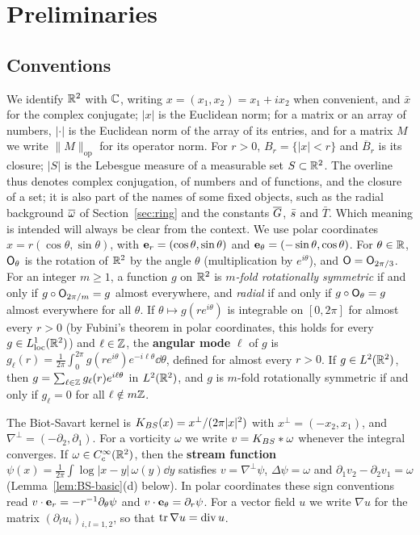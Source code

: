 \section{Preliminaries}
\label{sec:prelim}

\subsection{Conventions}

We identify $\mathbb{R}^2$ with $\mathbb{C}$, writing $x=(x_1,x_2)=x_1+ix_2$ when convenient,
and $\bar x$ for the complex conjugate; $|x|$ is the Euclidean norm; for a matrix or an array of numbers, $|\cdot|$ is the
Euclidean norm of the array of its entries, and for a matrix $M$ we write
$\|M\|_{\mathrm{op}}$ for its operator norm. For $r>0$, $B_r=\{|x|<r\}$ and
$\overline B_r$ is its closure; $|S|$ is the Lebesgue measure of a measurable
set $S\subset\mathbb{R}^2$. The overline thus denotes complex conjugation, of numbers and
of functions, and the closure of a set; it is also part of the names of some fixed
objects, such as the radial background $\overline{\omega}$ of Section~\ref{sec:ring} and the
constants $\overline{G}$, $\bar s$ and $\bar T$. Which meaning is intended will always be
clear from the context. We use polar
coordinates $x=r(\cos\theta,\sin\theta)$, with $\textbf{e}_r=(\cos\theta,\sin\theta)$
and $\textbf{e}_\theta=(-\sin\theta,\cos\theta)$. For $\theta\in\mathbb{R}$, $\mathsf{O}_\theta$ is
the rotation of $\mathbb{R}^2$ by the angle $\theta$ (multiplication by $e^{i\theta}$),
and $\mathsf{O}=\mathsf{O}_{2\pi/3}$. For an integer $m\ge1$, a function $g$ on $\mathbb{R}^2$ is
\textit{$m$-fold rotationally symmetric} if and only if $g\circ\mathsf{O}_{2\pi/m}=g$ almost
everywhere, and \textit{radial} if and only if $g\circ\mathsf{O}_\theta=g$ almost
everywhere for all $\theta$. If $\theta\mapsto g(re^{i\theta})$ is integrable
on $[0,2\pi]$ for almost every $r>0$ (by Fubini's theorem in polar
coordinates, this holds for every $g\in L^1_{\mathrm{loc}}(\mathbb{R}^2)$) and
$\ell\in\mathbb{Z}$, the \textbf{angular mode} $\ell$ of $g$ is
$g_\ell(r)=\frac1{2\pi}\int_0^{2\pi}g(re^{i\theta})e^{-i\ell\theta}\dd\theta$,
defined for almost every $r>0$. If $g\in L^2(\mathbb{R}^2)$, then
$g=\sum_{\ell\in\mathbb{Z}}g_\ell(r)e^{i\ell\theta}$ in $L^2(\mathbb{R}^2)$, and $g$ is
$m$-fold rotationally symmetric if and only if $g_\ell=0$ for all $\ell\notin m\mathbb{Z}$.

The Biot-Savart kernel is $K_{BS}(x)=x^\perp/(2\pi|x|^2)$ with
$x^\perp=(-x_2,x_1)$, and $\nabla^\perp=(-\partial_2,\partial_1)$. For a
vorticity $\omega$ we write $v=K_{BS}\ast\omega$ whenever the integral converges.
If $\omega\in C_c^\infty(\mathbb{R}^2)$, then the \textbf{stream function}
$\psi(x)=\frac1{2\pi}\int\log|x-y|\,\omega(y)\dd y$ satisfies
$v=\nabla^\perp\psi$, $\Delta\psi=\omega$ and $\partial_1v_2-\partial_2v_1=\omega$
(Lemma~\ref{lem:BS-basic}(d) below). In polar coordinates these sign
conventions read $v\cdot\textbf{e}_r=-r^{-1}\partial_\theta\psi$ and
$v\cdot\textbf{e}_\theta=\partial_r\psi$. For a vector field $u$ we write $\nabla u$ for
the matrix $(\partial_lu_i)_{i,l=1,2}$, so that $\operatorname{tr}\nabla
u=\operatorname{div} u$.

